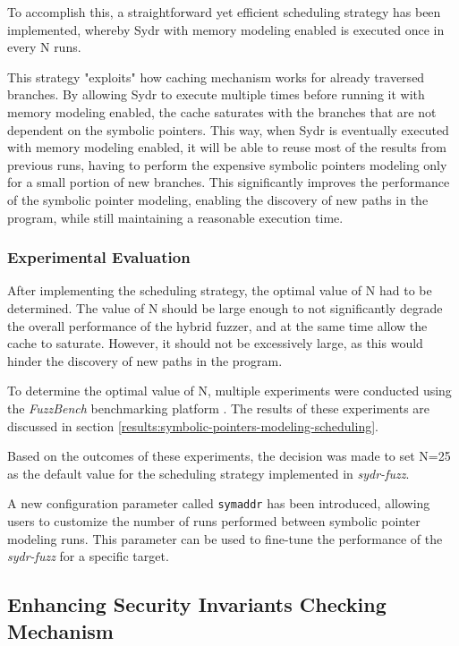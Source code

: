 To accomplish this, a straightforward yet efficient scheduling strategy has been implemented, whereby Sydr with memory modeling enabled is executed once in every N runs.

This strategy "exploits" how caching mechanism works for already traversed branches. By allowing Sydr to execute multiple times before running it with memory modeling enabled, the cache saturates with the branches that are not dependent on the symbolic pointers. This way, when Sydr is eventually executed with memory modeling enabled, it will be able to reuse most of the results from previous runs, having to perform the expensive symbolic pointers modeling only for a small portion of new branches. This significantly improves the performance of the symbolic pointer modeling, enabling the discovery of new paths in the program, while still maintaining a reasonable execution time.

\subsubsection{Experimental Evaluation}

After implementing the scheduling strategy, the optimal value of N had to be determined. The value of N should be large enough to not significantly degrade the overall performance of the hybrid fuzzer, and at the same time allow the cache to saturate. However, it should not be excessively large, as this would hinder the discovery of new paths in the program.

To determine the optimal value of N, multiple experiments were conducted using the \textit{FuzzBench} benchmarking platform \cite{fuzzbench-2021}. The results of these experiments are discussed in section \ref{results:symbolic-pointers-modeling-scheduling}.

Based on the outcomes of these experiments, the decision was made to set N=25 as the default value for the scheduling strategy implemented in \textit{sydr-fuzz}.

A new configuration parameter called \texttt{symaddr} has been introduced, allowing users to customize the number of runs performed between symbolic pointer modeling runs. This parameter can be used to fine-tune the performance of the \textit{sydr-fuzz} for a specific target.

\subsection{Enhancing Security Invariants Checking Mechanism} \label{hybrid-fuzzer-improvements:optimizing-security-predicates}


